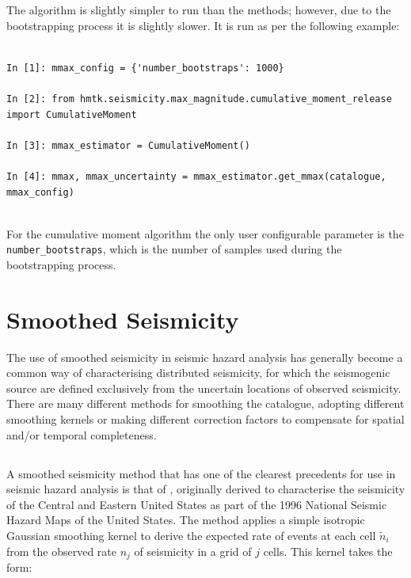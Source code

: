 The algorithm is slightly simpler to run than the \cite{Kijko2004} methods; however, due to the bootstrapping process it is slightly slower. It is run as per the following example:

\begin{Verbatim}[frame=single, commandchars=\\\{\}, fontsize=\scriptsize]

In [1]: mmax_config = {'number_bootstraps': 1000}
                       
In [2]: from hmtk.seismicity.max_magnitude.cumulative_moment_release import CumulativeMoment

In [3]: mmax_estimator = CumulativeMoment()

In [4]: mmax, mmax_uncertainty = mmax_estimator.get_mmax(catalogue, mmax_config)
                
\end{Verbatim}

For the cumulative moment algorithm the only user configurable parameter is the \verb=number_bootstraps=, which is the number of samples used during the bootstrapping process. 

\section{Smoothed Seismicity}

The use of smoothed seismicity in seismic hazard analysis has generally become a common way of characterising distributed seismicity, for which the seismogenic source are defined exclusively from the uncertain locations of observed seismicity. There are many different methods for smoothing the catalogue, adopting different smoothing kernels or making different correction factors to compensate for spatial and/or temporal completeness. 

\subsection{\cite{frankel1995}}

A smoothed seismicity method that has one of the clearest precedents for use in seismic hazard analysis is that of \cite{frankel1995}, originally derived to characterise the seismicity of the Central and Eastern United States as part of the 1996 National Seismic Hazard Maps of the United States. The method applies a simple isotropic Gaussian smoothing kernel to derive the expected rate of events at each cell $\tilde{n}_i$ from the observed rate $n_j$ of seismicity in a grid of $j$ cells. This kernel takes the form:

